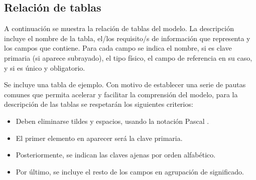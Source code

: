 \subsection{Relación de tablas}
\label{sec:tablesRelation}

A continuación se muestra la relación de tablas del modelo. La descripción incluye el nombre de la tabla, el/los requisito/s de información que representa y los campos que contiene. Para cada campo se indica el nombre, si es clave primaria (si aparece subrayado), el tipo físico, el campo de referencia en su caso, y si es único y obligatorio.

\begin{shaded}
Se incluye una tabla de ejemplo. Con motivo de establecer una serie de pautas comunes que permita acelerar y facilitar la comprensión del modelo, para la descripción de las tablas se respetarán los siguientes criterios:
\begin{itemize}
    \item Deben eliminarse tildes y espacios, usando la notación Pascal \cite{wiki2012pascal}.
    \item El primer elemento en aparecer será la clave primaria.
    \item Posteriormente, se indican las claves ajenas por orden alfabético.
    \item Por último, se incluye el resto de los campos en agrupación de significado.
\end{itemize}
\end{shaded}

\def \dbtName {Usuario}
\def \dbtIrq {Usuario (Tabla \ref{tab:irqUser}) [pág. \pageref{tab:irqUser}])}
\def \dbtNumFields {6} %
\def \dbtFields { 
            & \underline{\code{Id}} & \code{int32}          & & \checkmark & \checkmark   \\ \cline{2-6}
            & \code{EsSupervisor}   & \code{boolean}        & &            & \checkmark   \\ \cline{2-6}
            & \code{Nombre}         & \code{varchar(64)}    & &            & \checkmark   \\ \cline{2-6}
            & \code{Apellidos}      & \code{varchar(128)}   & &            & \checkmark   \\ \cline{2-6}
            & \code{Usuario}        & \code{varchar(16)}    & & \checkmark & \checkmark   \\ \cline{2-6}
\dbtTitle   & \code{Contrasenna}    & \code{varchar(16)}    & &            & \checkmark   \\ \hline
}
